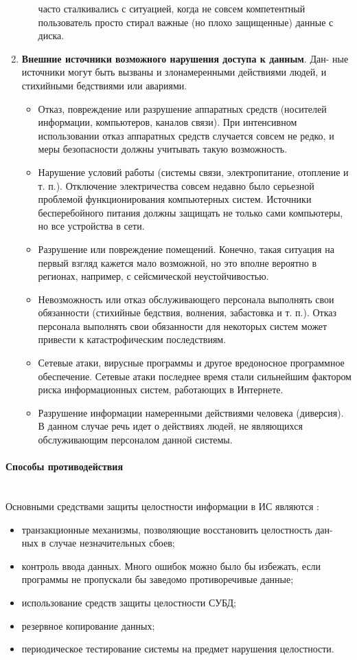 \begin{enumerate}
\begin{itemize}
часто сталкивались с ситуацией, когда не совсем компетентный пользователь просто стирал важные (но плохо защищенные) данные с диска.
\end{itemize}
\item \textbf{Внешние источники возможного нарушения доступа к данным}. Дан-
ные источники могут быть вызваны и злонамеренными действиями людей,
и стихийными бедствиями или авариями.
\begin{itemize}
\item Отказ, повреждение или разрушение аппаратных средств (носителей
информации, компьютеров, каналов связи). При интенсивном использовании отказ аппаратных средств случается совсем не редко, и меры
безопасности должны учитывать такую возможность.
\item Нарушение условий работы (системы связи, электропитание, отопление
и т. п.). Отключение электричества совсем недавно было серьезной
проблемой функционирования компьютерных систем. Источники бесперебойного питания должны защищать не только сами компьютеры, но все устройства в сети.
\item Разрушение или повреждение помещений. Конечно, такая ситуация на
первый взгляд кажется мало возможной, но это вполне вероятно в регионах, например, с сейсмической неустойчивостью.
\item Невозможность или отказ обслуживающего персонала выполнять свои
обязанности (стихийные бедствия, волнения, забастовка и т. п.). Отказ
персонала выполнять свои обязанности для некоторых систем может
привести к катастрофическим последствиям.
\item Сетевые атаки, вирусные программы и другое вредоносное программное обеспечение. Сетевые атаки последнее время стали сильнейшим
фактором риска информационных систем, работающих в Интернете.
\item Разрушение информации намеренными действиями человека (диверсия). В данном случае речь идет о действиях людей, не являющихся обслуживающим персоналом данной системы.
\end{itemize}
\end{enumerate}
\paragraph{Способы противодействия} ~\\

Основными средствами защиты целостности информации в ИС являются \autocite{Pirogov2009}:
\begin{itemize}
\item транзакционные механизмы, позволяющие восстановить целостность дан-
ных в случае незначительных сбоев;
\item контроль ввода данных. Много ошибок можно было бы избежать, если
программы не пропускали бы заведомо противоречивые данные;
\item использование средств защиты целостности СУБД;
\item резервное копирование данных;
\item периодическое тестирование системы на предмет нарушения целостности.
\end{itemize}

